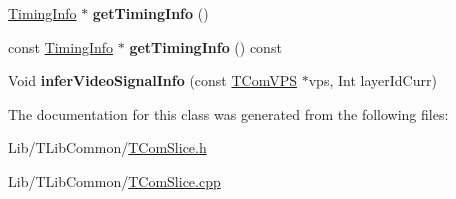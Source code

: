 \begin{DoxyCompactItemize}
\hyperlink{class_timing_info}{Timing\+Info} $\ast$ {\bfseries get\+Timing\+Info} ()
\item 
\mbox{\label{class_t_com_v_u_i_aa37abcd2fe6da1cd2216a2b9f457c6c8}} 
const \hyperlink{class_timing_info}{Timing\+Info} $\ast$ {\bfseries get\+Timing\+Info} () const
\item 
\mbox{\label{class_t_com_v_u_i_af49af42c2aa2863906061a6f6f2a8fba}} 
Void {\bfseries infer\+Video\+Signal\+Info} (const \hyperlink{class_t_com_v_p_s}{T\+Com\+V\+PS} $\ast$vps, Int layer\+Id\+Curr)
\end{DoxyCompactItemize}


The documentation for this class was generated from the following files\+:\begin{DoxyCompactItemize}
\item 
Lib/\+T\+Lib\+Common/\hyperlink{_t_com_slice_8h}{T\+Com\+Slice.\+h}\item 
Lib/\+T\+Lib\+Common/\hyperlink{_t_com_slice_8cpp}{T\+Com\+Slice.\+cpp}\end{DoxyCompactItemize}
